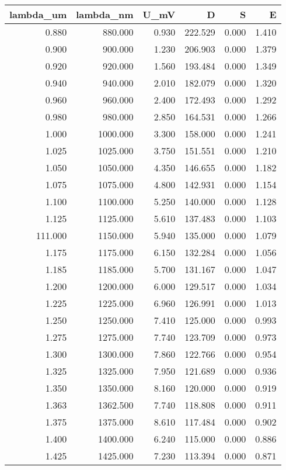 \begin{tabular}{rrrrrr}
\toprule
lambda_um & lambda_nm & U_mV & D & S & E \\
\midrule
0.880 & 880.000 & 0.930 & 222.529 & 0.000 & 1.410 \\
0.900 & 900.000 & 1.230 & 206.903 & 0.000 & 1.379 \\
0.920 & 920.000 & 1.560 & 193.484 & 0.000 & 1.349 \\
0.940 & 940.000 & 2.010 & 182.079 & 0.000 & 1.320 \\
0.960 & 960.000 & 2.400 & 172.493 & 0.000 & 1.292 \\
0.980 & 980.000 & 2.850 & 164.531 & 0.000 & 1.266 \\
1.000 & 1000.000 & 3.300 & 158.000 & 0.000 & 1.241 \\
1.025 & 1025.000 & 3.750 & 151.551 & 0.000 & 1.210 \\
1.050 & 1050.000 & 4.350 & 146.655 & 0.000 & 1.182 \\
1.075 & 1075.000 & 4.800 & 142.931 & 0.000 & 1.154 \\
1.100 & 1100.000 & 5.250 & 140.000 & 0.000 & 1.128 \\
1.125 & 1125.000 & 5.610 & 137.483 & 0.000 & 1.103 \\
111.000 & 1150.000 & 5.940 & 135.000 & 0.000 & 1.079 \\
1.175 & 1175.000 & 6.150 & 132.284 & 0.000 & 1.056 \\
1.185 & 1185.000 & 5.700 & 131.167 & 0.000 & 1.047 \\
1.200 & 1200.000 & 6.000 & 129.517 & 0.000 & 1.034 \\
1.225 & 1225.000 & 6.960 & 126.991 & 0.000 & 1.013 \\
1.250 & 1250.000 & 7.410 & 125.000 & 0.000 & 0.993 \\
1.275 & 1275.000 & 7.740 & 123.709 & 0.000 & 0.973 \\
1.300 & 1300.000 & 7.860 & 122.766 & 0.000 & 0.954 \\
1.325 & 1325.000 & 7.950 & 121.689 & 0.000 & 0.936 \\
1.350 & 1350.000 & 8.160 & 120.000 & 0.000 & 0.919 \\
1.363 & 1362.500 & 7.740 & 118.808 & 0.000 & 0.911 \\
1.375 & 1375.000 & 8.610 & 117.484 & 0.000 & 0.902 \\
1.400 & 1400.000 & 6.240 & 115.000 & 0.000 & 0.886 \\
1.425 & 1425.000 & 7.230 & 113.394 & 0.000 & 0.871 \\

\end{tabular}

